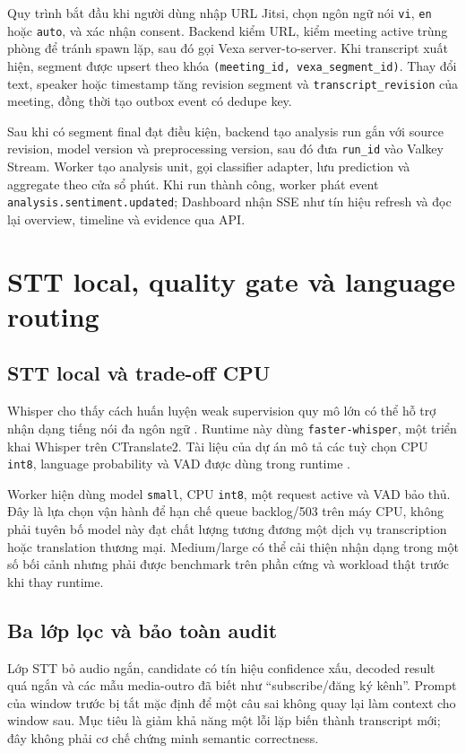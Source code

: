 Quy trình bắt đầu khi người dùng nhập URL Jitsi, chọn ngôn ngữ nói \texttt{vi}, \texttt{en} hoặc \texttt{auto}, và xác nhận consent. Backend kiểm URL, kiểm meeting active trùng phòng để tránh spawn lặp, sau đó gọi Vexa server-to-server. Khi transcript xuất hiện, segment được upsert theo khóa \texttt{(meeting\_id, vexa\_segment\_id)}. Thay đổi text, speaker hoặc timestamp tăng revision segment và \texttt{transcript\_revision} của meeting, đồng thời tạo outbox event có dedupe key.

Sau khi có segment final đạt điều kiện, backend tạo analysis run gắn với source revision, model version và preprocessing version, sau đó đưa \texttt{run\_id} vào Valkey Stream. Worker tạo analysis unit, gọi classifier adapter, lưu prediction và aggregate theo cửa sổ phút. Khi run thành công, worker phát event \texttt{analysis.sentiment.\allowbreak updated}; Dashboard nhận SSE như tín hiệu refresh và đọc lại overview, timeline và evidence qua API.

\section{STT local, quality gate và language routing}
\subsection{STT local và trade-off CPU}
Whisper cho thấy cách huấn luyện weak supervision quy mô lớn có thể hỗ trợ nhận dạng tiếng nói đa ngôn ngữ \cite{whisper2022}. Runtime này dùng \texttt{faster-whisper}, một triển khai Whisper trên CTranslate2. Tài liệu của dự án mô tả các tuỳ chọn CPU \texttt{int8}, language probability và VAD được dùng trong runtime \cite{fasterwhisper2026}.

Worker hiện dùng model \texttt{small}, CPU \texttt{int8}, một request active và VAD bảo thủ. Đây là lựa chọn vận hành để hạn chế queue backlog/503 trên máy CPU, không phải tuyên bố model này đạt chất lượng tương đương một dịch vụ transcription hoặc translation thương mại. Medium/large có thể cải thiện nhận dạng trong một số bối cảnh nhưng phải được benchmark trên phần cứng và workload thật trước khi thay runtime.

\subsection{Ba lớp lọc và bảo toàn audit}
Lớp STT bỏ audio ngắn, candidate có tín hiệu confidence xấu, decoded result quá ngắn và các mẫu media-outro đã biết như ``subscribe/đăng ký kênh''. Prompt của window trước bị tắt mặc định để một câu sai không quay lại làm context cho window sau. Mục tiêu là giảm khả năng một lỗi lặp biến thành transcript mới; đây không phải cơ chế chứng minh semantic correctness.

